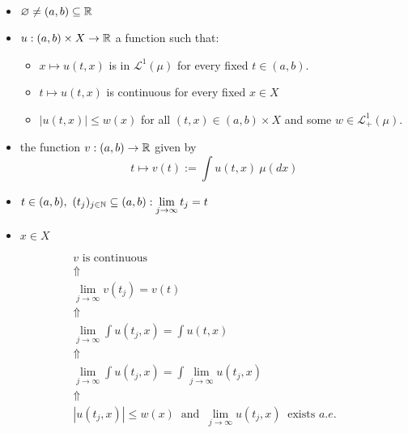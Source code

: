 \newpage
\begin{minipage}[t]{0.46\textwidth}
\begin{given}
\begin{itemize}
\item \(\varnothing \neq (a,b)\subseteq \Bbb{R} \)
\item \(u:(a,b)\times X\rightarrow  \Bbb{R}\) a function such that:
\begin{itemize}
  \item \(x\mapsto  u (t,x)\) is in \(\mathcal{L}^1(\mu )\) for every fixed \(t\in (a,b)\).
  \item \(t\mapsto u(t,x)\) is continuous for every fixed \(x\in X\)
  \item \(|u(t,x)|\leq w(x)\) for all \((t,x)\in (a,b)\times X\) and some \(w\in \mathcal{L}_{+}^1(\mu ).\)

\end{itemize}
\item the function \(v:(a,b)\rightarrow \Bbb{R}\) given by
\[
t\mapsto v(t):= \int  u(t,x)\  \mu (dx)
\]

\end{itemize}
\end{given}

\begin{random}
\begin{itemize}
  \item \(\displaystyle t\in (a,b),\  (t_{j})_{j\in \Bbb{N}}\subseteq (a,b): \lim_{j\rightarrow \infty }t_{j}=t\)
 \item \( x \in X\)
\end{itemize}

\end{random}

\end{minipage}
\begin{minipage}[t]{0.55\textwidth}
\vspace{-0.1in}
\begin{gather*}
v \text{ is continuous} \\
\Uparrow  \\
\lim_{j\rightarrow \infty }v(t_{j})=v(t) \\
\Uparrow  \\
\lim_{j\rightarrow \infty }\int  u(t_{j},x)=\int u(t,x) \\
\Uparrow  \\
\lim_{j\rightarrow \infty }\int  u(t_{j},x)=\int \lim_{j\rightarrow \infty }u(t_{j},x) \\
\Uparrow  \\
|u(t_{j},x)|\leq  w(x)\  \text{ and }\  \lim_{j\rightarrow \infty }u(t_{j},x)\  \text{ exists }a.e.
\end{gather*}

\end{minipage}

